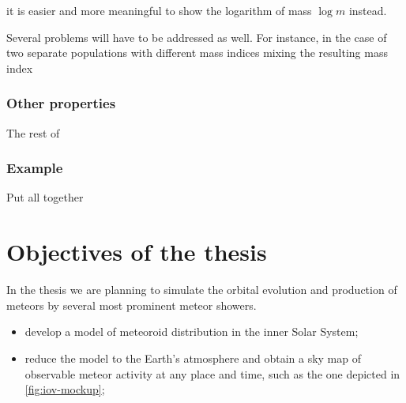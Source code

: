             it is easier and more meaningful to show the logarithm of mass $\log m$ instead.

            Several problems will have to be addressed as well. For instance, in the case
            of two separate populations with different mass indices mixing the resulting
            mass index 

        \subsubsection{Other properties} \label{iovo}
           The rest of 

        \subsubsection{Example} \label{iove}
            Put all together




\section{Objectives of the thesis} \label{iO}
    In the thesis we are planning to simulate the orbital evolution and production of meteors
    by several most prominent meteor showers.

    \begin{itemize}
        \item develop a model of meteoroid distribution in the inner Solar System;
        \item reduce the model to the Earth's atmosphere and obtain a sky map
            of observable meteor activity at any place and time,
            such as the one depicted in \cref{fig:iov-mockup};

    \end{itemize}

